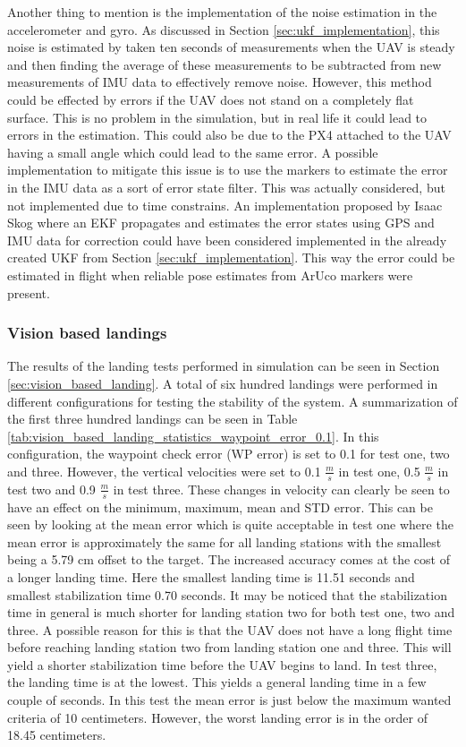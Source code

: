\documentclass[../Head/report.tex]{subfiles}
\begin{document}
Another thing to mention is the implementation of the noise estimation in the accelerometer and gyro. As discussed in Section \ref{sec:ukf_implementation}, this noise is estimated by taken ten seconds of measurements when the UAV is steady and then finding the average of these measurements to be subtracted from new measurements of IMU data to effectively remove noise. However, this method could be effected by errors if the UAV does not stand on a completely flat surface. This is no problem in the simulation, but in real life it could lead to errors in the estimation. This could also be due to the PX4 attached to the UAV having a small angle which could lead to the same error. A possible implementation to mitigate this issue is to use the markers to estimate the error in the IMU data as a sort of error state filter. This was actually considered, but not implemented due to time constrains. An implementation proposed by Isaac Skog \cite{GNSSaidedINS} where an EKF propagates and estimates the error states using GPS and IMU data for correction could have been considered implemented in the already created UKF from Section \ref{sec:ukf_implementation}. This way the error could be estimated in flight when reliable pose estimates from ArUco markers were present.    

\subsubsection*{Vision based landings}
The results of the landing tests performed in simulation can be seen in Section \ref{sec:vision_based_landing}. A total of six hundred landings were performed in different configurations for testing the stability of the system. A summarization of the first three hundred landings can be seen in Table \ref{tab:vision_based_landing_statistics_waypoint_error_0.1}. In this configuration, the waypoint check error (WP error) is set to 0.1 for test one, two and three. However, the vertical velocities were set to 0.1 $\frac{m}{s}$ in test one, 0.5 $\frac{m}{s}$ in test two and 0.9 $\frac{m}{s}$ in test three. These changes in velocity can clearly be seen to have an effect on the minimum, maximum, mean and STD error. This can be seen by looking at the mean error which is quite acceptable in test one where the mean error is approximately the same for all landing stations with the smallest being a 5.79 cm offset to the target. The increased accuracy comes at the cost of a longer landing time. Here the smallest landing time is 11.51 seconds and smallest stabilization time 0.70 seconds. It may be noticed that the stabilization time in general is much shorter for landing station two for both test one, two and three. A possible reason for this is that the UAV does not have a long flight time before reaching landing station two from landing station one and three. This will yield a shorter stabilization time before the UAV begins to land. In test three, the landing time is at the lowest. This yields a general landing time in a few couple of seconds. In this test the mean error is just below the maximum wanted criteria of 10 centimeters. However, the worst landing error is in the order of 18.45 centimeters. 
\end{document}
